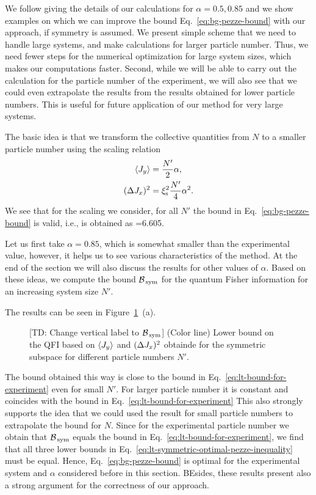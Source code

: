 We follow giving the details of our calculations for $\alpha=0.5,0.85$ and we show examples on which we can improve the bound Eq.~\eqref{eq:bg-pezze-bound} with our approach, if symmetry is assumed.
We present simple scheme that we need to handle large systems, and make calculations for larger particle number.
Thus, we need fewer steps for the numerical optimization for large system sizes, which makes our computations faster.
Second, while we will be able to carry out the calculation for the particle number of the experiment, we will also see that we could even extrapolate the results from the results obtained for lower particle numbers.
This is useful for future application of our method for very large systems.

The basic idea is that we transform the collective quantities from $N$ to a smaller particle number using the scaling relation
\begin{align}
  \langle J_y \rangle & = \frac{N'}{2}\alpha,\\
  (\Delta J_x )^2 & = \xi_{\textnormal{s}}^2 \frac{N'}{4}\alpha^2.
\end{align}
We see that for the scaling we consider, for all $N'$ the bound in Eq.~\eqref{eq:bg-pezze-bound} is valid, i.e., is obtained as
\be
  \geq {}=6.605.
\ee

Let us first take $\alpha=0.85$, which is somewhat smaller than the experimental value, however, it helps us to see various characteristics of the method.
At the end of the section we will also discuss the results for other values of $\alpha$.
Based on these ideas, we compute the bound $\mathcal{B}_{\, \textnormal{sym} }$ for the quantum Fisher information for an increasing system size $N'$.

The results can be seen in Figure~\ref{fig:lt-bounds-on-symmetric-spin-squeezing}~(a).
\begin{figure}
  \centering
  \caption[Asymptotic behaviour of the bound for increasing particle number for spin-squeezing experimental data]{[TD: Change vertical label to $\mathcal{B}_{\, \textnormal{sym} }$] (Color line) Lower bound on the QFI based on $\langle J_y \rangle$ and $(\Delta J_x )^2$ obtainde for the symmetric subspace for different particle numbers $N'$.}
  \label{fig:lt-bounds-on-symmetric-spin-squeezing}
\end{figure}
The bound obtained this way is close to the bound in Eq.~\eqref{eq:lt-bound-for-experiment} even for small $N'$.
For larger particle number it is constant and coincides with the bound in Eq.~\eqref{eq:lt-bound-for-experiment}
This also strongly supports the idea that we could used the result for small particle numbers to extrapolate the bound for $N$.
Since for the experimental particle number we obtain that $\mathcal{B}_{\, \text{sym} }$ equals the bound in Eq.~\eqref{eq:lt-bound-for-experiment}, we find that all three lower bounds in Eq.~\eqref{eq:lt-symmetric-optimal-pezze-inequality} must be equal.
Hence, Eq.~\eqref{eq:bg-pezze-bound} is optimal for the experimental system and $\alpha$ considered before in this section.
BEsides, these results present also a strong argument for the correctness of our approach.

